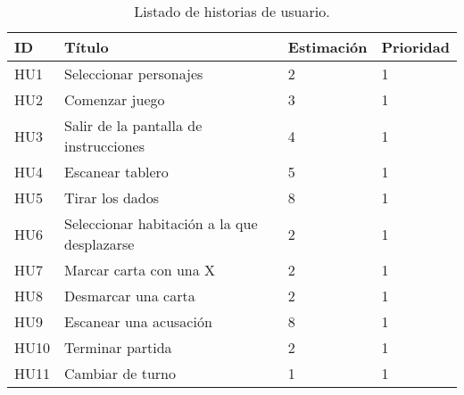 \begin{table}[h]
  \begin{center}
    \begin{tabular}{|p{1cm}|p{7.5cm}|p{1.9cm}|p{1.6cm}|}

      \hline
        \rowcolor{Gray} \textbf{ID}
        & \textbf{Título}
        & \textbf{Estimación}
        & \textbf{Prioridad}\\

      \hline
      HU1
      & Seleccionar personajes
      & 2
      & 1\\

      \hline
      HU2
      & Comenzar juego
      & 3
      & 1\\

      \hline
      HU3
      & Salir de la pantalla de instrucciones
      & 4
      & 1\\

      \hline
      HU4
      & Escanear tablero
      & 5
      & 1\\

      \hline
      HU5
      & Tirar los dados
      & 8
      & 1\\

      \hline
      HU6
      & Seleccionar habitación a la que desplazarse
      & 2
      & 1\\

      \hline
      HU7
      & Marcar carta con una X
      & 2
      & 1\\

      \hline
      HU8
      & Desmarcar una carta
      & 2
      & 1\\

      \hline
      HU9
      & Escanear una acusación
      & 8
      & 1\\

      \hline
      HU10
      & Terminar partida
      & 2
      & 1\\

      \hline
      HU11
      & Cambiar de turno
      & 1
      & 1\\

      \hline

    \end{tabular}

    \caption{Listado de historias de usuario.}
    \label{tabla-lista-historias-usuario}

  \end{center}
\end{table}

